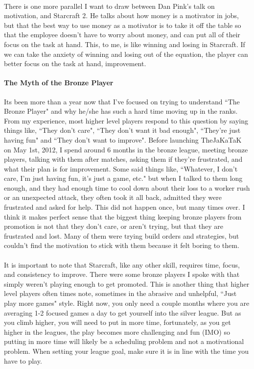 \documentclass{article}
\begin{document}
\paragraph{}
There is one more parallel I want to draw between Dan Pink's talk on
motivation, and Starcraft 2. He talks about how money is a motivator in jobs,
but that the best way to use money as a motivator is to take it off the table
so that the employee doesn't have to worry about money, and can put all of
their focus on the task at hand. This, to me, is like winning and losing in
Starcraft. If we can take the anxiety of winning and losing out of the
equation, the player can better focus on the task at hand, improvement.

\paragraph{The Myth of the Bronze Player}
Its been more than a year now that I've focused on trying to understand ``The
Bronze Player" and why he/she has such a hard time moving up in the ranks.
From my experience, most higher level players respond to this question by
saying things like, ``They don't care", ``They don't want it bad enough",
``They're just having fun" and ``They don't want to improve". Before launching
TheJaKaTaK on May 1st, 2012, I spend around 6 months in the bronze league,
meeting bronze players, talking with them after matches, asking them if
they're frustrated, and what their plan is for improvement. Some said things
like, ``Whatever, I don't care, I'm just having fun, it's just a game, etc."
but when I talked to them long enough, and they had enough time to cool down
about their loss to a worker rush or an unexpected attack, they often took it
all back, admitted they were frustrated and asked for help. This did not
happen once, but many times over. I think it makes perfect sense that the
biggest thing keeping bronze players from promotion is not that they don't
care, or aren't trying, but that they are frustrated and lost. Many of them
were trying build orders and strategies, but couldn't find the motivation to
stick with them because it felt boring to them.

\paragraph{}
It is important to note that Starcraft, like any other skill, requires time,
focus, and consistency to improve. There were some bronze players I spoke with
that simply weren't playing enough to get promoted. This is another thing that
higher level players often times note, sometimes in the abrasive and
unhelpful, ``Just play more games" style. Right now, you only need a couple
months where you are averaging 1-2 focused games a day to get yourself into
the silver league. But as you climb higher, you will need to put in more time,
fortunately, as you get higher in the leagues, the play becomes more
challenging and fun (IMO) so putting in more time will likely be a scheduling
problem and not a motivational problem. When setting your league goal, make
sure it is in line with the time you have to play.
\end{document}

